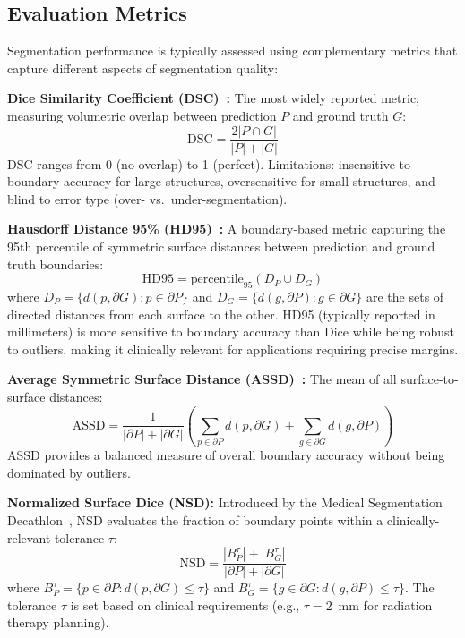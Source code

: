 \documentclass[conference]{IEEEtran}
\begin{document}
\subsection{Evaluation Metrics}

Segmentation performance is typically assessed using complementary metrics that capture different aspects of segmentation quality:

\textbf{Dice Similarity Coefficient (DSC)~\cite{dice1945measures}:} The most widely reported metric, measuring volumetric overlap between prediction $P$ and ground truth $G$:
\begin{equation}
\text{DSC} = \frac{2|P \cap G|}{|P| + |G|}
\end{equation}
DSC ranges from 0 (no overlap) to 1 (perfect). Limitations: insensitive to boundary accuracy for large structures, oversensitive for small structures, and blind to error type (over- vs.\ under-segmentation).

\textbf{Hausdorff Distance 95\% (HD95)~\cite{huttenlocher1993comparing}:} A boundary-based metric capturing the 95th percentile of symmetric surface distances between prediction and ground truth boundaries:
\begin{equation}
\text{HD95} = \text{percentile}_{95}(D_P \cup D_G)
\end{equation}
where $D_P = \{d(p, \partial G) : p \in \partial P\}$ and $D_G = \{d(g, \partial P) : g \in \partial G\}$ are the sets of directed distances from each surface to the other. HD95 (typically reported in millimeters) is more sensitive to boundary accuracy than Dice while being robust to outliers, making it clinically relevant for applications requiring precise margins.

\textbf{Average Symmetric Surface Distance (ASSD)~\cite{heimann2009comparison}:} The mean of all surface-to-surface distances:
\begin{equation}
\text{ASSD} = \frac{1}{|\partial P| + |\partial G|}\left(\sum_{p \in \partial P} d(p, \partial G) + \sum_{g \in \partial G} d(g, \partial P)\right)
\end{equation}
ASSD provides a balanced measure of overall boundary accuracy without being dominated by outliers.

\textbf{Normalized Surface Dice (NSD):} Introduced by the Medical Segmentation Decathlon~\cite{msd2022}, NSD evaluates the fraction of boundary points within a clinically-relevant tolerance $\tau$:
\begin{equation}
\text{NSD} = \frac{|B_P^\tau| + |B_G^\tau|}{|\partial P| + |\partial G|}
\end{equation}
where $B_P^\tau = \{p \in \partial P : d(p, \partial G) \leq \tau\}$ and $B_G^\tau = \{g \in \partial G : d(g, \partial P) \leq \tau\}$. The tolerance $\tau$ is set based on clinical requirements (e.g., $\tau = 2$~mm for radiation therapy planning).
\end{document}

